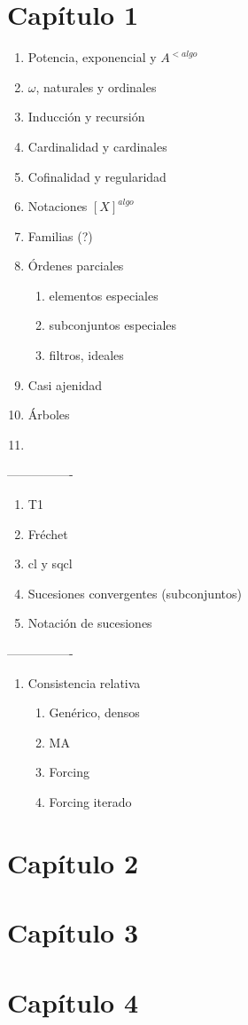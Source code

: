 \documentclass[letterpaper,DIV=12,12pt]{scrbook}
\begin{document}
    \chapter*{Capítulo 1}
        \begin{enumerate}
            \item Potencia, exponencial y $A^{< algo}$
            \item $\omega$, naturales y ordinales
            \item Inducción y recursión
            \item Cardinalidad y cardinales
            \item Cofinalidad y regularidad
            \item Notaciones $[X]^{algo}$
            \item Familias (?)
            \item Órdenes parciales
            \begin{enumerate}
                \item elementos especiales
                \item subconjuntos especiales
                \item filtros, ideales
            \end{enumerate}
            \item Casi ajenidad
            \item Árboles
            \item 
        \end{enumerate}
        ----------------
        \begin{enumerate}
            \item T1
            \item Fréchet
            \item cl y sqcl
            \item Sucesiones convergentes
            (subconjuntos)
            \item Notación de sucesiones
        \end{enumerate}
        ----------------
        \begin{enumerate}
            \item Consistencia relativa
            \begin{enumerate}
                \item Genérico, densos
                \item MA
                \item Forcing
                \item Forcing iterado
            \end{enumerate}
        \end{enumerate}

    \chapter*{Capítulo 2}
    \chapter*{Capítulo 3}
    \chapter*{Capítulo 4}
\end{document}
